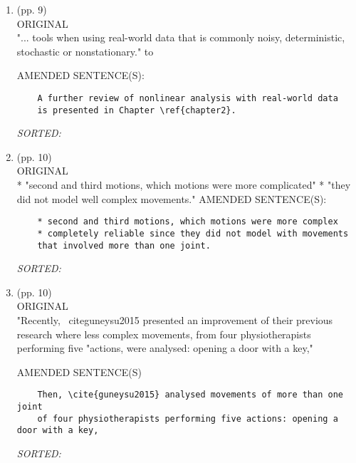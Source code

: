 \documentclass[12pt]{article}
\begin{document}
\begin{enumerate}


\item  (pp. 9)    \\
ORIGINAL \\
	"... tools when using real-world data that is commonly noisy, 
	deterministic, stochastic or nonstationary." to 

	AMENDED SENTENCE(S): \\
	\begin{verbatim}
	A further review of nonlinear analysis with real-world data 
	is presented in Chapter \ref{chapter2}.

	\end{verbatim}
	\textit{
	SORTED:  
	}
	\\


\item  (pp. 10)  \\ 
ORIGINAL \\
	* "second and third motions, which motions were more complicated"
	* "they did not model well complex movements."	
	AMENDED SENTENCE(S): \\
\begin{verbatim}
	* second and third motions, which motions were more complex
 	* completely reliable since they did not model with movements 
	that involved more than one joint.
	\end{verbatim}
	\textit{
	SORTED:  
	}
	\\




\item  (pp. 10)  \\

ORIGINAL \\
	"Recently, \ cite{guneysu2015} presented an improvement of their previous research
	where less complex movements, from four physiotherapists performing five 
	"actions, were analysed: opening a door with a key,"

	AMENDED SENTENCE(S) \\
\begin{verbatim}
	Then, \cite{guneysu2015} analysed movements of more than one joint 
	of four physiotherapists performing five actions: opening a door with a key,
	\end{verbatim}
	\textit{
	SORTED:  
	}
	\\





\end{enumerate}
\end{document}
